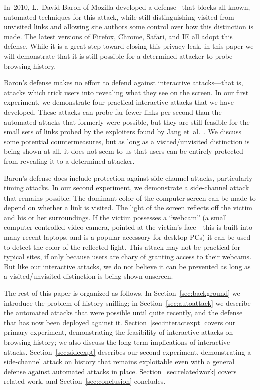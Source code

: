 \documentclass[conference]{IEEEtran}
\begin{document}
In~2010, L.~David Baron of Mozilla developed a
defense~\cite{moz_visited_defense} that blocks all known, automated
techniques for this attack, while still distinguishing visited from
unvisited links and allowing site authors some control over how this
distinction is made.  The latest versions of Firefox, Chrome, Safari,
and IE all adopt this defense.  While it is a great step toward
closing this privacy leak, in this paper we will demonstrate that it
is still possible for a determined attacker to probe browsing history.

Baron's defense makes no effort to defend against interactive
attacks---that is, attacks which trick users into revealing what they
see on the screen.  In our first experiment, we demonstrate four
practical interactive attacks that we have developed.  These attacks
can probe far fewer links per second than the automated attacks that
formerly were possible, but they are still feasible for the small sets
of links probed by the exploiters found by Jang
et~al.~\cite{jang10empirical}.  We discuss some potential
countermeasures, but as long as a visited/unvisited distinction is
being shown at all, it does not seem to us that users can be entirely
protected from revealing it to a determined attacker.

Baron's defense does include protection against side-channel attacks,
particularly timing attacks.  In our second experiment, we demonstrate
a side-channel attack that remains possible: The dominant color of the
computer screen can be made to depend on whether a link is visited.
The light of the screen reflects off the victim and his or her
surroundings.  If the victim possesses a “webcam” (a small
computer-controlled video camera, pointed at the victim's face---this
is built into many recent laptops, and is a popular accessory for
desktop PCs) it can be used to detect the color of the reflected
light.  This attack may not be practical for typical sites, if only
because users are chary of granting access to their webcams.  But like
our interactive attacks, we do not believe it can be prevented as long
as a visited/unvisited distinction is being shown onscreen.

The rest of this paper is organized as follows.  In
Section~\ref{sec:background} we introduce the problem of history
sniffing; in Section~\ref{sec:autoattack} we describe the automated
attacks that were possible until quite recently, and the defense that
has now been deployed against it.  Section~\ref{sec:interactexpt}
covers our primary experiment, demonstrating the feasibility of
interactive attacks on browsing history; we also discuss the long-term
implications of interactive attacks.  Section~\ref{sec:sideexpt}
describes our second experiment, demonstrating a side-channel attack
on history that remains exploitable even with a general defense
against automated attacks in place. Section~\ref{sec:relatedwork}
covers related work, and Section~\ref{sec:conclusion} concludes.
\end{document}
